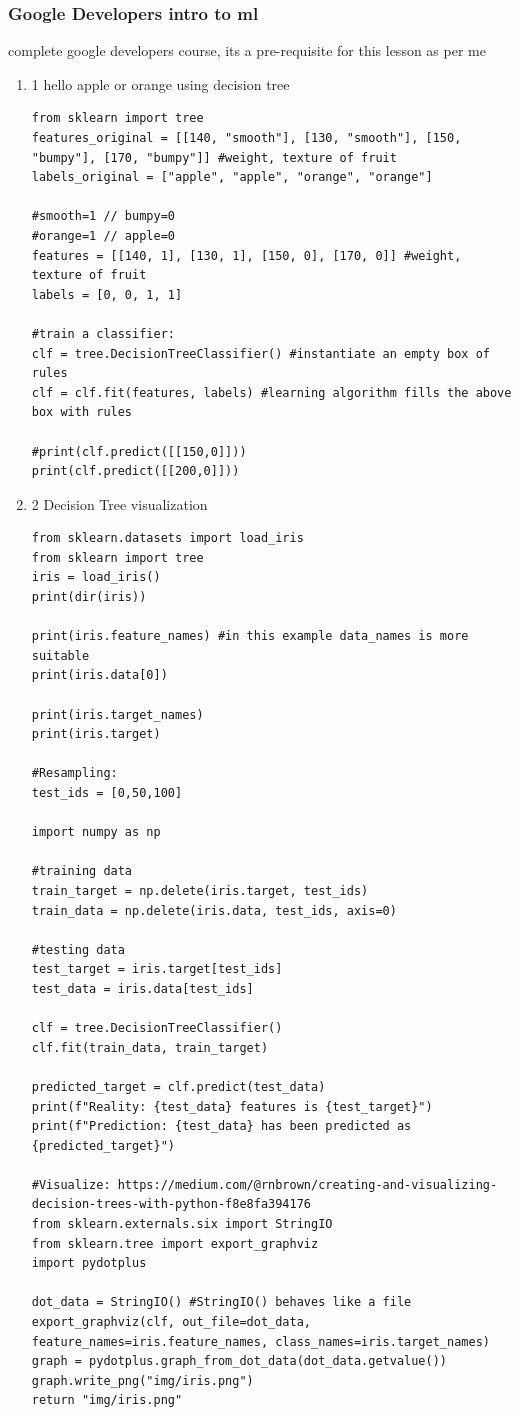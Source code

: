 \documentclass[11pt]{article}
\begin{document}
\subsubsection{Google Developers intro to ml}
\label{sec:org3cebe2c}
complete google developers course, its a pre-requisite for this lesson as per me

\begin{enumerate}
\item 1 hello apple or orange using decision tree
\label{sec:orgf508d50}
\begin{verbatim}
from sklearn import tree
features_original = [[140, "smooth"], [130, "smooth"], [150, "bumpy"], [170, "bumpy"]] #weight, texture of fruit
labels_original = ["apple", "apple", "orange", "orange"]

#smooth=1 // bumpy=0
#orange=1 // apple=0
features = [[140, 1], [130, 1], [150, 0], [170, 0]] #weight, texture of fruit
labels = [0, 0, 1, 1]

#train a classifier: 
clf = tree.DecisionTreeClassifier() #instantiate an empty box of rules
clf = clf.fit(features, labels) #learning algorithm fills the above box with rules

#print(clf.predict([[150,0]]))
print(clf.predict([[200,0]]))
\end{verbatim}


\item 2 Decision Tree visualization
\label{sec:org2d0386a}

\begin{verbatim}
from sklearn.datasets import load_iris
from sklearn import tree
iris = load_iris()
print(dir(iris))

print(iris.feature_names) #in this example data_names is more suitable
print(iris.data[0])

print(iris.target_names)
print(iris.target)

#Resampling:
test_ids = [0,50,100]

import numpy as np

#training data
train_target = np.delete(iris.target, test_ids)
train_data = np.delete(iris.data, test_ids, axis=0)

#testing data
test_target = iris.target[test_ids]
test_data = iris.data[test_ids]

clf = tree.DecisionTreeClassifier()
clf.fit(train_data, train_target)

predicted_target = clf.predict(test_data)
print(f"Reality: {test_data} features is {test_target}")
print(f"Prediction: {test_data} has been predicted as {predicted_target}")

#Visualize: https://medium.com/@rnbrown/creating-and-visualizing-decision-trees-with-python-f8e8fa394176
from sklearn.externals.six import StringIO  
from sklearn.tree import export_graphviz
import pydotplus

dot_data = StringIO() #StringIO() behaves like a file
export_graphviz(clf, out_file=dot_data, feature_names=iris.feature_names, class_names=iris.target_names)
graph = pydotplus.graph_from_dot_data(dot_data.getvalue())  
graph.write_png("img/iris.png")
return "img/iris.png"
\end{verbatim}
\end{enumerate}
\end{document}

